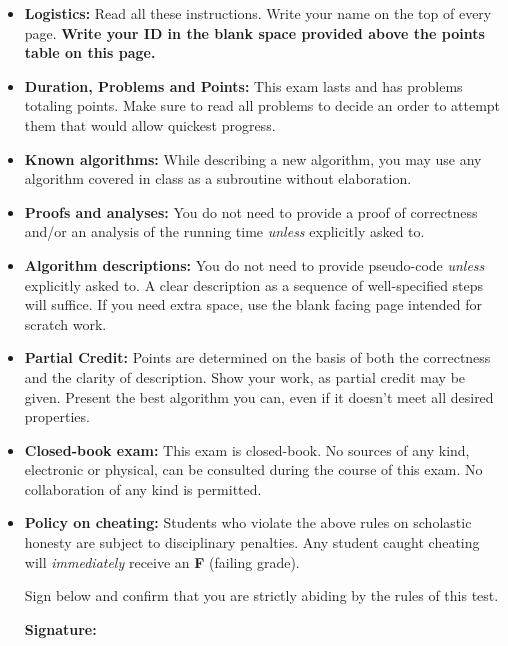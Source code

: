 
\begin{itemize}[leftmargin=*]
\item \textbf{Logistics:} Read all these instructions. Write your name on the top of every page. \textbf{Write your ID in the blank space provided above the points table on this page.}

\item \textbf{Duration, Problems and Points:} This exam lasts \textbf{\examTotalTime} and has \textbf{\examNumberOfProblems} problems totaling \textbf{\examTotalPoints} points. Make sure to read all problems to decide an order to attempt them that would allow quickest progress.

\item \textbf{Known algorithms:} While describing a new algorithm, you may use any algorithm covered in class as a subroutine without elaboration.

\item \textbf{Proofs and analyses:} You do not need to provide a proof of correctness and/or an analysis of the running time \emph{unless} explicitly asked to.

\item \textbf{Algorithm descriptions:} You do not need to provide pseudo-code \emph{unless} explicitly asked to. A clear description as a sequence of well-specified steps will suffice. If you need extra space, use the blank facing page intended for scratch work.

\item \textbf{Partial Credit:} Points are determined on the basis of both the correctness and the clarity of description. Show your work, as partial credit may be given. Present the best algorithm you can, even if it doesn't meet all desired properties.

\item \textbf{Closed-book exam:} This exam is closed-book. No sources of any kind, electronic or physical, can be consulted during the course of this exam. No collaboration of any kind is permitted.

\item \textbf{Policy on cheating:} Students who violate the above rules on scholastic honesty are subject to disciplinary penalties. Any student caught cheating will \textit{immediately} receive an \textbf{F} (failing grade).

  Sign below and confirm that you are strictly abiding by the rules of this test.

  \vspace{5ex}

  \begin{center}
    \textbf{Signature:} {\vrule height0.2pt width3in}
  \end{center}
\end{itemize}

